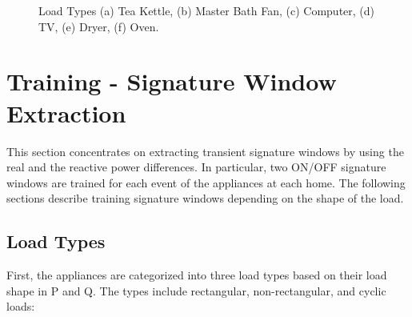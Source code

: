\documentclass[conference]{IEEEtran}
\begin{document}
\begin{figure}[!t]
{		\label{fig:event2}}
	\hfill
	\caption{Load Types (a) Tea Kettle, (b) Master Bath Fan, (c) Computer, (d) TV, (e) Dryer, (f) Oven.}
	\label{fig:demon}
\end{figure}	

\section{Training - Signature Window Extraction}\label{sec:training}
This section concentrates on extracting transient signature windows by using the real and the reactive power differences.  In particular, two ON/OFF signature windows are trained for each event of the appliances at each home.  The following sections describe training signature windows depending on the shape of the load.  


\subsection{Load Types}
First, the appliances are categorized into three load types based on their load shape in P and Q.  The types include rectangular, non-rectangular, and cyclic loads:
\end{document}
